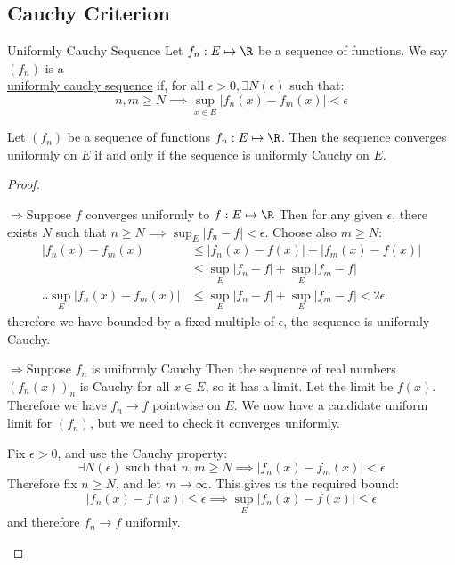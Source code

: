 \documentclass[../Main.tex]{subfiles}
\begin{document}
\subsection{Cauchy Criterion}
\begin{definition}{Uniformly Cauchy Sequence}
    Let $f_n : E \mapsto \R$ be a sequence of functions. We say $(f_n)$ is a\\\underline{uniformly cauchy sequence} if, for all $\epsilon > 0, \exists N(\epsilon)$ such that:
    \begin{equation}
        n, m \geq N \implies \sup_{x \in E} |f_n(x) - f_m(x)| < \epsilon
        \label{eqnSequenceCauchy}
    \end{equation}
\end{definition}
\begin{theorem}
    Let $(f_n)$ be a sequence of functions $f_n : E \mapsto \R$. Then the sequence converges uniformly on $E$ if and only if the sequence is uniformly Cauchy on $E$.
    \label{thmCauchyCriterion}
\end{theorem}
\begin{proof}
    \begin{proofdirection}{$\Rightarrow$}{Suppose $f$ converges uniformly to $f : E \mapsto \R$}
        Then for any given $\epsilon$, there exists $N$ such that $n \geq N \implies \sup_{E} |f_n - f| < \epsilon$.
        Choose also $m \geq N$:
        \begin{align*}
            |f_n(x) - f_m(x) &\leq |f_n(x) - f(x)| + |f_m(x) - f(x)| \\
            &\leq \sup_E |f_n - f| + \sup_E |f_m - f| \\
            \therefore \sup_E |f_n(x) - f_m(x)| &\leq \sup_E |f_n - f| + \sup_E |f_m - f| < 2\epsilon.
        \end{align*}
        therefore we have bounded by a fixed multiple of $\epsilon$, the sequence is uniformly Cauchy.
    \end{proofdirection}
    \begin{proofdirection}{$\Rightarrow$}{Suppose $f_n$ is uniformly Cauchy}
        Then the sequence of real numbers $(f_n(x))_n$ is Cauchy for all $x \in E$, so it has a limit. Let the limit be $f(x)$. Therefore we have $f_n \to f$ pointwise on $E$. We now have a candidate uniform limit for $(f_n)$, but we need to check it converges uniformly.

        Fix $\epsilon > 0$, and use the Cauchy property:
        \begin{equation*}
            \exists N(\epsilon) \text{ such that } n, m \geq N \implies |f_n(x) - f_m(x)| < \epsilon
        \end{equation*}
        Therefore fix $n \geq N$, and let $m \to \infty$. This gives us the required bound:
        \begin{equation*}
            |f_n(x) - f(x)| \leq \epsilon \implies \sup_E |f_n(x) - f(x)| \leq \epsilon
        \end{equation*}
        and therefore $f_n \to f$ uniformly.
    \end{proofdirection}
\end{proof}
\end{document}
